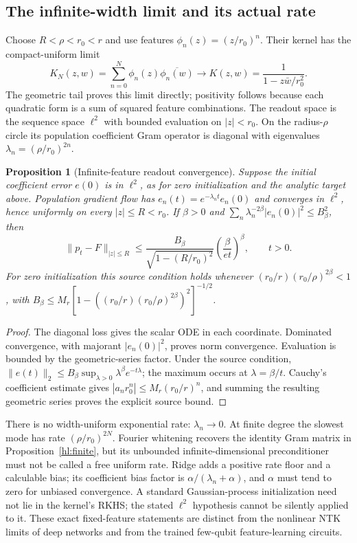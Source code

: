 \documentclass[11pt,oneside,openany]{book}
\newtheorem{proposition}[theorem]{Proposition}
\theoremstyle{definition}\newtheorem{definition}[theorem]{Definition}
\theoremstyle{remark}\newtheorem{remark}[theorem]{Remark}
\begin{document}
\subsection{The infinite-width limit and its actual rate}
Choose $R<\rho<r_0<r$ and use features $\phi_n(z)=(z/r_0)^n$.
Their kernel has the compact-uniform limit
\[
 K_N(z,w)=\sum_{n=0}^N\phi_n(z)\overline{\phi_n(w)}
 \longrightarrow K(z,w)=\frac1{1-z\bar w/r_0^2}.
\]
The geometric tail proves this limit directly; positivity follows because
each quadratic form is a sum of squared feature combinations. The readout
space is the sequence space $\ell^2$ with bounded evaluation on $|z|<r_0$.
On the radius-$\rho$ circle its population coefficient Gram operator is
diagonal with eigenvalues $\lambda_n=(\rho/r_0)^{2n}$.

\begin{proposition}[Infinite-feature readout convergence]\label{hl:infinite}
Suppose the initial coefficient error $e(0)$ is in $\ell^2$, as for zero
initialization and the analytic target above. Population gradient flow has
$e_n(t)=e^{-\lambda_nt}e_n(0)$ and converges in $\ell^2$, hence uniformly on
every $|z|\le R<r_0$. If $\beta>0$ and
$\sum_n\lambda_n^{-2\beta}|e_n(0)|^2\le B_\beta^2$, then
\[
 \|p_t-F\|_{|z|\le R}
 \le\frac{B_\beta}{\sqrt{1-(R/r_0)^2}}
       \left(\frac{\beta}{et}\right)^\beta,\qquad t>0.
\]
For zero initialization this source condition holds whenever
$(r_0/r)(r_0/\rho)^{2\beta}<1$, with
$B_\beta\le M_r[1-((r_0/r)(r_0/\rho)^{2\beta})^2]^{-1/2}$.
\end{proposition}
\begin{proof}
The diagonal loss gives the scalar ODE in each coordinate. Dominated
convergence, with majorant $|e_n(0)|^2$, proves norm convergence. Evaluation
is bounded by the geometric-series factor. Under the source condition,
$\|e(t)\|_2\le B_\beta\sup_{\lambda>0}\lambda^\beta e^{-t\lambda}$;
the maximum occurs at $\lambda=\beta/t$. Cauchy's coefficient estimate gives
$|a_n r_0^n|\le M_r(r_0/r)^n$, and summing the resulting geometric series
proves the explicit source bound.
\end{proof}

There is no width-uniform exponential rate: $\lambda_n\to0$. At finite
degree the slowest mode has rate $(\rho/r_0)^{2N}$. Fourier whitening recovers
the identity Gram matrix in Proposition~\ref{hl:finite}, but its unbounded
infinite-dimensional preconditioner must not be called a free uniform rate.
Ridge adds a positive rate floor and a calculable bias; its coefficient bias
factor is $\alpha/(\lambda_n+\alpha)$, and $\alpha$ must tend to zero for
unbiased convergence. A standard Gaussian-process initialization need not
lie in the kernel's RKHS; the stated $\ell^2$ hypothesis cannot be silently
applied to it. These exact fixed-feature statements are distinct from the
nonlinear NTK limits of deep networks \cite{HLNTK} and from the trained
few-qubit feature-learning circuits.
\end{document}
